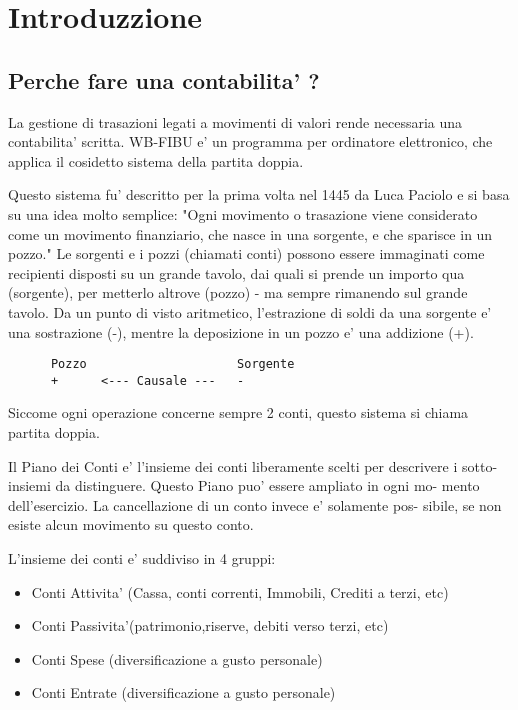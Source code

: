 \documentclass[12pt]{report}
\begin{document}
\tableofcontents

\chapter{Introduzzione}

\section{Perche fare una contabilita' ?}
La gestione  di trasazioni legati a movimenti di valori rende  necessaria una
contabilita' scritta. WB-FIBU e' un programma per ordinatore elettronico, che
applica il cosidetto sistema della partita doppia.  

Questo sistema fu' descritto  per la  prima volta nel 1445 da Luca Paciolo e 
si basa su una idea molto semplice:
"Ogni movimento o trasazione viene considerato come un movimento finanziario,
che nasce in una sorgente, e che sparisce in un pozzo."
Le sorgenti e i pozzi (chiamati conti) possono essere immaginati come 
recipienti disposti su un grande tavolo, dai  quali si prende un importo qua 
(sorgente), per  metterlo altrove (pozzo) -  ma sempre  rimanendo sul grande 
tavolo.
Da un punto di visto aritmetico, l'estrazione di soldi da una sorgente e' una
sostrazione (-), mentre la deposizione in un pozzo e' una addizione (+).

\begin{verbatim}
      Pozzo                     Sorgente
      +      <--- Causale ---   -
\end{verbatim}

Siccome ogni operazione concerne sempre 2 conti, questo sistema si chiama
partita doppia.

Il Piano dei Conti e' l'insieme dei conti liberamente scelti per descrivere i
sotto-insiemi da distinguere. Questo Piano puo' essere ampliato in ogni mo- 
mento dell'esercizio. La cancellazione di un conto invece e' solamente pos- 
sibile, se non esiste alcun movimento su questo conto.

L'insieme dei conti e' suddiviso in 4 gruppi:

\begin{itemize}
   \item Conti Attivita' (Cassa, conti correnti, Immobili, Crediti a terzi, etc)
\item Conti Passivita'(patrimonio,riserve, debiti verso terzi, etc)
\item Conti Spese   (diversificazione a gusto personale) 
\item Conti Entrate (diversificazione a gusto personale) 
\end{itemize}
\end{document}
